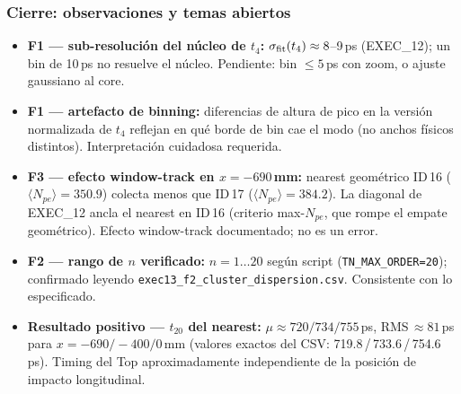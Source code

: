 \documentclass[aspectratio=169]{beamer}
\begin{document}
\begin{frame}
\frametitle{Cierre: observaciones y temas abiertos}
\small
\begin{itemize}
  \item \textbf{F1 --- sub-resoluci\'on del n\'ucleo de $t_4$:} $\sigma_{\rm fit}(t_4)\approx 8$--9\,ps
        (EXEC\_12); un bin de 10\,ps no resuelve el n\'ucleo. Pendiente: bin $\leq5$\,ps con zoom,
        o ajuste gaussiano al core.
  \item \textbf{F1 --- artefacto de binning:} diferencias de altura de pico en la versi\'on
        normalizada de $t_4$ reflejan en qu\'e borde de bin cae el modo (no anchos f\'isicos
        distintos). Interpretaci\'on cuidadosa requerida.
  \item \textbf{F3 --- efecto window-track en $x=-690$\,mm:} nearest geom\'etrico ID\,16
        ($\langle N_{pe}\rangle=350.9$) colecta menos que ID\,17 ($\langle N_{pe}\rangle=384.2$).
        La diagonal de EXEC\_12 ancla el nearest en ID\,16 (criterio max-$N_{pe}$, que rompe
        el empate geom\'etrico). Efecto window-track documentado; no es un error.
  \item \textbf{F2 --- rango de $n$ verificado:} $n=1\ldots20$ seg\'un script
        (\texttt{TN\_MAX\_ORDER=20}); confirmado leyendo \texttt{exec13\_f2\_cluster\_dispersion.csv}.
        Consistente con lo especificado.
  \item \textbf{Resultado positivo --- $t_{20}$ del nearest:}
        $\mu\approx720/734/755$\,ps, RMS\,$\approx81$\,ps para $x=-690/-400/0$\,mm (valores
        exactos del CSV: 719.8\,/\,733.6\,/\,754.6\,ps). Timing del Top aproximadamente
        independiente de la posici\'on de impacto longitudinal.
\end{itemize}
\end{frame}
\end{document}
